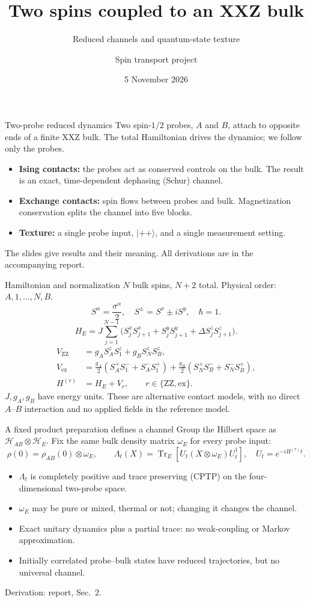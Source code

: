 \documentclass[aspectratio=169,11pt]{beamer}
\title{Two spins coupled to an XXZ bulk}
\subtitle{Reduced channels and quantum-state texture}
\author{Spin transport project}
\date{5 November 2026}
\newcommand{\ket}[1]{\lvert #1\rangle}
\newcommand{\Tr}{\operatorname{Tr}}
\newcommand{\ZZ}{\mathrm{ZZ}}
\newcommand{\ex}{\mathrm{ex}}
\newcommand{\report}[1]{{\color{muted}\footnotesize Derivation: report, #1.}}
\begin{document}
\begin{frame}[plain]
\titlepage
\end{frame}

\begin{frame}{Two-probe reduced dynamics}
Two spin-$1/2$ probes, $A$ and $B$, attach to opposite ends of a finite
XXZ bulk. The total Hamiltonian drives the dynamics; we follow only the probes.
\medskip
\begin{itemize}\setlength\itemsep{9pt}
\item \textbf{Ising contacts:} the probes act as conserved controls on the
bulk. The result is an exact, time-dependent dephasing (Schur) channel.
\item \textbf{Exchange contacts:} spin flows between probes and bulk.
Magnetization conservation splits the channel into five blocks.
\item \textbf{Texture:} a single probe input, $\ket{++}$, and a single
measurement setting.
\end{itemize}
\medskip
The slides give results and their meaning. All derivations are in the
accompanying report.
\end{frame}

\begin{frame}{Hamiltonian and normalization}
\small
$N$ bulk spins, $N+2$ total. Physical order: $A,1,\ldots,N,B$.
\[
S^\alpha=\frac{\sigma^\alpha}{2},\quad
S^\pm=S^x\pm iS^y,\quad \hbar=1.
\]
\[
H_E=J\sum_{j=1}^{N-1}
\bigl(S_j^xS_{j+1}^x+S_j^yS_{j+1}^y+\Delta S_j^zS_{j+1}^z\bigr).
\]
\begin{align*}
V_{\ZZ}&=g_A S_A^zS_1^z+g_B S_N^zS_B^z,\\
V_{\ex}&=\frac{g_A}{2}(S_A^+S_1^-+S_A^-S_1^+)
         +\frac{g_B}{2}(S_N^+S_B^-+S_N^-S_B^+),\\
H^{(r)}&=H_E+V_r,\qquad r\in\{\ZZ,\ex\}.
\end{align*}
$J,g_A,g_B$ have energy units. These are alternative contact models,
with no direct $A$--$B$ interaction and no applied fields in the reference model.
\end{frame}

\begin{frame}{A fixed product preparation defines a channel}
Group the Hilbert space as $\mathcal H_{AB}\otimes\mathcal H_E$.
Fix the same bulk density matrix $\omega_E$ for every probe input:
\[
\rho(0)=\rho_{AB}(0)\otimes\omega_E,\qquad
\boxed{\Lambda_t(X)=\Tr_E[U_t(X\otimes\omega_E)U_t^\dagger],\quad U_t=e^{-iH^{(r)}t}.}
\]
\begin{itemize}\setlength\itemsep{7pt}
\item $\Lambda_t$ is completely positive and trace preserving (CPTP) on the
four-dimensional two-probe space.
\item $\omega_E$ may be pure or mixed, thermal or not; changing it changes the channel.
\item Exact unitary dynamics plus a partial trace: no weak-coupling or Markov
approximation.
\item Initially correlated probe--bulk states have reduced trajectories,
but no universal channel.
\end{itemize}
\report{Sec.~2}
\end{frame}
\end{document}
